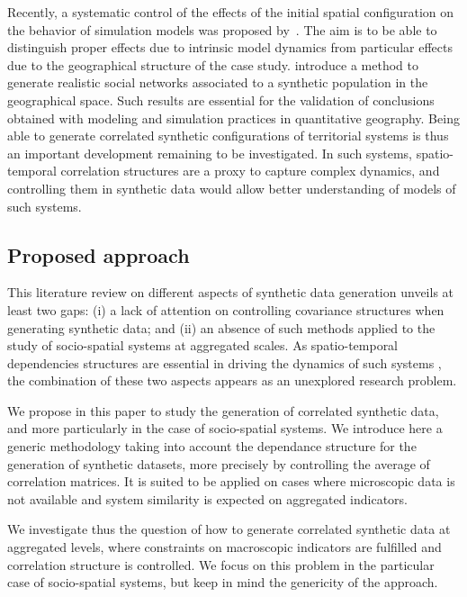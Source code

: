 \documentclass{article}
\begin{document}
Recently, a systematic control of the effects of the initial spatial configuration on the behavior of simulation models was proposed by~\cite{raimbault2018space}. The aim is to be able to distinguish proper effects due to intrinsic model dynamics from particular effects due to the geographical structure of the case study. \cite{arentze2012modeling} introduce a method to generate realistic social networks associated to a synthetic population in the geographical space. Such results are essential for the validation of conclusions obtained with modeling and simulation practices in quantitative geography. Being able to generate correlated synthetic configurations of territorial systems is thus an important development remaining to be investigated. In such systems, spatio-temporal correlation structures are a proxy to capture complex dynamics, and controlling them in synthetic data would allow better understanding of models of such systems.


\subsection*{Proposed approach}

This literature review on different aspects of synthetic data generation unveils at least two gaps: (i) a lack of attention on controlling covariance structures when generating synthetic data; and (ii) an absence of such methods applied to the study of socio-spatial systems at aggregated scales. As spatio-temporal dependencies structures are essential in driving the dynamics of such systems \cite{pigozzi1980interurban,chen2009urban}, the combination of these two aspects appears as an unexplored research problem.

We propose in this paper to study the generation of correlated synthetic data, and more particularly in the case of socio-spatial systems. We introduce here a generic methodology taking into account the dependance structure for the generation of synthetic datasets, more precisely by controlling the average of correlation matrices. It is suited to be applied on cases where microscopic data is not available and system similarity is expected on aggregated indicators.

We investigate thus the question of how to generate correlated synthetic data at aggregated levels, where constraints on macroscopic indicators are fulfilled and correlation structure is controlled. We focus on this problem in the particular case of socio-spatial systems, but keep in mind the genericity of the approach.
\end{document}
